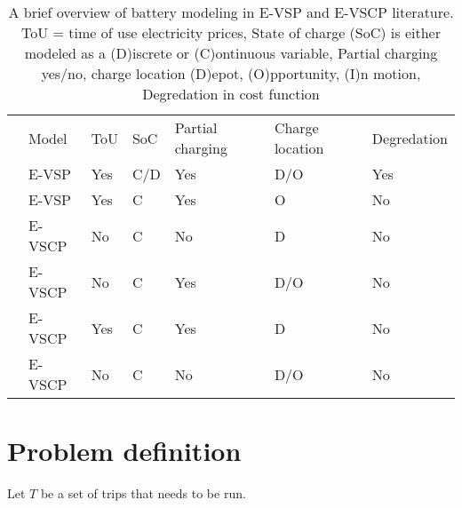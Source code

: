 \documentclass[]{article}
\begin{document}
\begin{table}[h]
  \centering
  \begin{tabular}{cllllll}
      \toprule
      & Model & ToU & SoC & Partial charging & Charge location & Degredation \\
      \cmidrule(lr){2-7}
      \cite{vanKootenNiekerk2017} & E-VSP & Yes & C/D & Yes & D/O & Yes \\
      \cite{Jiang2021} & E-VSP & Yes & C & Yes & O & No \\ 
      \cite{PERUMAL2021105268} & E-VSCP & No & C & No & D & No  \\
      \cite{SISTIG2023120915} & E-VSCP & No & C & Yes & D/O & No \\
      \cite{su14063627} & E-VSCP & Yes & C & Yes & D & No \\
      \cite{SHEN2023} & E-VSCP & No & C & No & D/O & No \\
      \bottomrule
  \end{tabular}
  \caption{A brief overview of battery modeling in E-VSP and E-VSCP literature. ToU = time of use electricity prices, State of charge (SoC) is either modeled as a (D)iscrete or (C)ontinuous variable, Partial charging yes/no, charge location (D)epot, (O)pportunity, (I)n motion, Degredation in cost function}
  \label{tab:evscp-lit}
\end{table}

\section{Problem definition}
Let $T$ be a set of trips that needs to be run. 
\printbibliography
\end{document}
